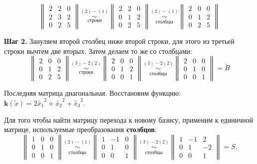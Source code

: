 $$\begin{Vmatrix}
2 & 2 & 0 \\
2 & 3 & 2 \\
0 & 2 & 5
\end{Vmatrix} \underset{\text{строки}}{\overset{(2)-(1)}{ \sim}} \begin{Vmatrix}
2 & 2 & 0 \\
0 & 1 & 2 \\
0 & 2 & 5
\end{Vmatrix} \underset{\text{столбцы}}{\overset{(2)-(1)}{ \sim}} \begin{Vmatrix}
2 & 0 & 0 \\
0 & 1 & 2 \\
0 & 2 & 5
\end{Vmatrix} $$

\textbf{Шаг 2.} Зануляем второй столбец ниже второй строки, для этого из третьей строки вычтем две вторых. Затем делаем то же со столбцами:
$$\begin{Vmatrix}
2 & 0 & 0 \\
0 & 1 & 2 \\
0 & 2 & 5
\end{Vmatrix} \underset{\text{строки}}{\overset{(3)-2(2)}{ \sim}} \begin{Vmatrix}
2 & 0 & 0 \\
0 & 1 & 2 \\
0 & 0 & 1
\end{Vmatrix} \underset{\text{столбцы}}{\overset{(3)-2(2)}{ \sim}} \begin{Vmatrix}
2 & 0 & 0 \\
0 & 1 & 0 \\
0 & 0 & 1
\end{Vmatrix}=\widetilde{B} $$

Последняя матрица диагональная. Восстановим функцию: $\mathbf{k}(\widetilde{x})=2\widetilde{x_1}^2+\widetilde{x_2}^2+\widetilde{x_3}^2$.

Для того чтобы найти матрицу перехода к новому базису, применим к единичной матрице, используемые преобразования \textbf{столбцов}:
$$\begin{Vmatrix}
1 & 0 & 0 \\
0 & 1 & 0 \\
0 & 0 & 1
\end{Vmatrix} \underset{\text{столбцы}}{\overset{(2)-(1)}{ \sim}} \begin{Vmatrix}
1 & -1 & 0 \\
0 & 1 & 0 \\
0 & 0 & 1
\end{Vmatrix} \underset{\text{столбцы}}{\overset{(3)-2(2)}{ \sim}} \begin{Vmatrix}
1 & -1 & 2 \\
0 & 1 & -2 \\
0 & 0 & 1
\end{Vmatrix} = S.$$

